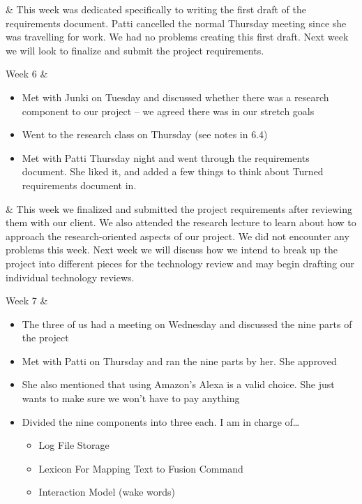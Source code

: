 \documentclass[onecolumn, draftclsnofoot,10pt, compsoc]{IEEEtran}
\begin{document}
\begin{center}
\begin{longtabu}
			&
			{
				This week was dedicated specifically to writing the first draft of the requirements document.
				Patti cancelled the normal Thursday meeting since she was travelling for work.
				We had no problems creating this first draft.
				Next week we will look to finalize and submit the project requirements.
			}
			\\ \hline

			Week 6
			&
			{
				\begin{itemize}
					\item Met with Junki on Tuesday and discussed whether there was a research component to our project -- we agreed there was in our stretch goals
					\item Went to the research class on Thursday (see notes in 6.4)
					\item Met with Patti Thursday night and went through the requirements document. She liked it, and added a few things to think about
					Turned requirements document in.
				\end{itemize}
			}

			&
			{
				This week we finalized and submitted the project requirements after reviewing them with our client.
				We also attended the research lecture to learn about how to approach the research-oriented aspects of our project.
				We did not encounter any problems this week.
				Next week we will discuss how we intend to break up the project into different pieces for the technology review and may begin drafting our individual technology reviews.
			}
			\\ \hline

			Week 7
			&
			{
					\begin{itemize}
						\item The three of us had a meeting on Wednesday and discussed the nine parts of the project
						\item Met with Patti on Thursday and ran the nine parts by her. She approved
						\item She also mentioned that using Amazon's Alexa is a valid choice. She just wants to make sure we won't have to pay anything
						\item Divided the nine components into three each. I am in charge of…
						 \begin{itemize}
						 	\item Log File Storage
						 	\item Lexicon For Mapping Text to Fusion Command
						 	\item Interaction Model (wake words)
						 \end{itemize}
					\end{itemize}
			}


\end{longtabu}
\end{center}
\end{document}
